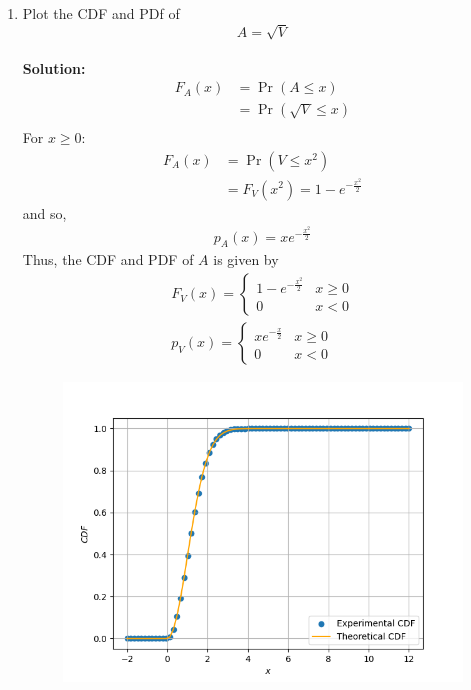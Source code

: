 \documentclass[journal,12pt,twocolumn]{IEEEtran}
\numberwithin{equation}{section}
\renewcommand\thesection{\arabic{section}}
\providecommand{\pr}[1]{\ensuremath{\Pr\left(#1\right)}}
\newcommand{\solution}{\noindent \textbf{\\ Solution: }}
\begin{document}
\begin{enumerate}[label=\thesection.\arabic*
        ,ref=\thesection.\theenumi]
\begin{align}
\begin{cases}
                  0                           & x < 0
              \end{cases} \label{eq:chi-pdf}
          \end{align}
    \item
          \label{ch3_raleigh_sim}
          Plot the CDF and PDf of
          \begin{equation}
              A = \sqrt{V}
          \end{equation}
          \solution
          \begin{align}
              F_A(x) & = \pr{A \leq x}        \\
                     & = \pr{\sqrt{V} \leq x} \\
          \end{align}
          For $x \geq 0$:
          \begin{align}
              F_A(x) & = \pr{V \leq x^2}                   \\
                     & = F_V(x^2) = 1 - e^{-\frac{x^2}{2}}
          \end{align}
          and so,
          \begin{align}
              p_A(x) = xe^{-\frac{x^2}{2}}
          \end{align}
          Thus, the CDF and PDF of $A$ is given by
          \begin{align}
              F_V(x) =
              \begin{cases}
                  1 - e^{-\frac{x^2}{2}} & x \geq 0 \\
                  0                      & x < 0
              \end{cases} \label{eq:ral-cdf} \\
              p_V(x) =
              \begin{cases}
                  xe^{-\frac{x}{2}} & x \geq 0 \\
                  0                 & x < 0
              \end{cases} \label{eq:ral-pdf}
          \end{align}
          \begin{figure}[H]
              \centering
              \includegraphics[width = \columnwidth]{../figs/6-3_cdf}

\end{figure}
\end{enumerate}
\end{document}
